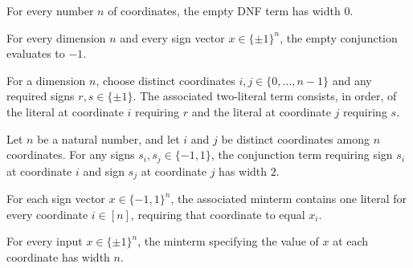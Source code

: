 \begin{theorem}
\label{FABL.DNFTerm.width_empty}
\leanok
{}
For every number $n$ of coordinates, the empty DNF term has width $0$.
\end{theorem}

\begin{theorem}
\label{FABL.DNFTerm.eval_empty}
\leanok
{}
For every dimension $n$ and every sign vector $x\in\{\pm1\}^n$, the empty conjunction
evaluates to $-1$.
\end{theorem}

\begin{definition}
\label{FABL.DNFTerm.pair}
\leanok
{}
For a dimension $n$, choose distinct coordinates $i,j\in\{0,\ldots,n-1\}$ and any
required signs $r,s\in\{\pm1\}$. The associated two-literal term consists, in order, of
the literal at coordinate $i$ requiring $r$ and the literal at coordinate $j$ requiring
$s$.
\end{definition}

\begin{theorem}
\label{FABL.DNFTerm.width_pair}
\leanok
{}
Let $n$ be a natural number, and let $i$ and $j$ be distinct coordinates among $n$
coordinates. For any signs $s_i,s_j\in\{-1,1\}$, the conjunction term requiring sign
$s_i$ at coordinate $i$ and sign $s_j$ at coordinate $j$ has width $2$.
\end{theorem}

\begin{definition}
\label{FABL.DNFTerm.minterm}
\leanok
{}
For each sign vector $x\in\{-1,1\}^n$, the associated minterm contains one literal for
every coordinate $i\in[n]$, requiring that coordinate to equal $x_i$.
\end{definition}

\begin{theorem}
\label{FABL.DNFTerm.width_minterm}
\leanok
{}
For every input $x\in\{\pm1\}^n$, the minterm specifying the value of $x$ at each
coordinate has width $n$.
\end{theorem}

